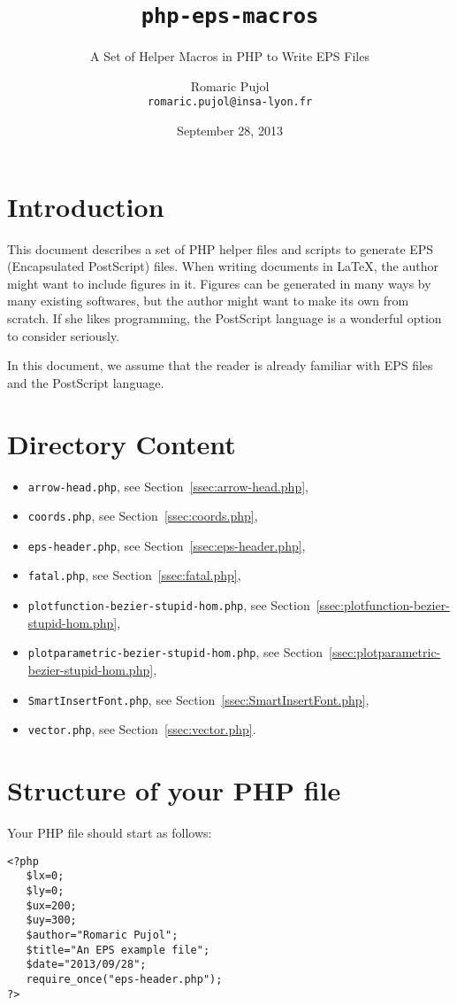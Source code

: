 \documentclass[10pt,a4paper]{scrartcl}
\title{\texttt{php-eps-macros}}
\subtitle{A Set of Helper Macros in PHP to Write EPS Files}
\author{Romaric Pujol\\\footnotesize{\texttt{romaric.pujol@insa-lyon.fr}}}
\date{September 28, 2013}
\newcommand\PS{PostScript}
\begin{document}
\maketitle
\section{Introduction}
This document describes a set of PHP helper files and scripts to generate EPS
   (Encapsulated \PS) files.
When writing documents in \LaTeX, the author might want to include figures in
   it.
Figures can be generated in many ways by many existing softwares, but the
   author might want to make its own from scratch.
If she likes programming, the PostScript language is a wonderful option to
   consider seriously.

In this document, we assume that the reader is already familiar with EPS files
and the \PS{} language.

\section{Directory Content}
\begin{itemize}
\item \texttt{arrow-head.php}, see Section~\ref{ssec:arrow-head.php},
\item \texttt{coords.php}, see Section~\ref{ssec:coords.php},
\item \texttt{eps-header.php}, see Section~\ref{ssec:eps-header.php},
\item \texttt{fatal.php}, see Section~\ref{ssec:fatal.php},
\item \texttt{plotfunction-bezier-stupid-hom.php}, see Section~\ref{ssec:plotfunction-bezier-stupid-hom.php},
\item \texttt{plotparametric-bezier-stupid-hom.php}, see Section~\ref{ssec:plotparametric-bezier-stupid-hom.php},
\item \texttt{SmartInsertFont.php}, see Section~\ref{ssec:SmartInsertFont.php},
\item \texttt{vector.php}, see Section~\ref{ssec:vector.php}.
\end{itemize}

\section{Structure of your PHP file}
Your PHP file should start as follows:
\lstset{language=PHP}
\begin{lstlisting}
<?php
   $lx=0;
   $ly=0;
   $ux=200;
   $uy=300;
   $author="Romaric Pujol";
   $title="An EPS example file";
   $date="2013/09/28";
   require_once("eps-header.php");
?>
\end{lstlisting}
\end{document}
